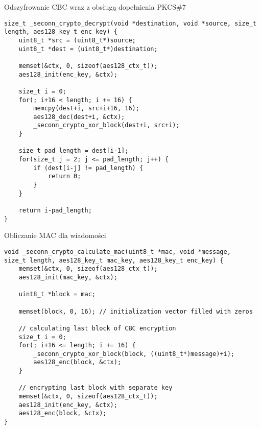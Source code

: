 \begin{table}
\caption{Odszyfrowanie CBC wraz z obsługą dopełnienia PKCS\#7}
\label{lst:decrypt}
\begin{lstlisting}
size_t _seconn_crypto_decrypt(void *destination, void *source, size_t length, aes128_key_t enc_key) {
    uint8_t *src = (uint8_t*)source;
    uint8_t *dest = (uint8_t*)destination;

    memset(&ctx, 0, sizeof(aes128_ctx_t));
    aes128_init(enc_key, &ctx);

    size_t i = 0;
    for(; i+16 < length; i += 16) {
        memcpy(dest+i, src+i+16, 16);
        aes128_dec(dest+i, &ctx);
        _seconn_crypto_xor_block(dest+i, src+i);
    }

    size_t pad_length = dest[i-1];
    for(size_t j = 2; j <= pad_length; j++) {
        if (dest[i-j] != pad_length) {
            return 0;
        }
    }

    return i-pad_length;
}
\end{lstlisting}
\end{table}

\begin{table}
\caption{Obliczanie MAC dla wiadomości}
\label{lst:mac}
\begin{lstlisting}
void _seconn_crypto_calculate_mac(uint8_t *mac, void *message,
size_t length, aes128_key_t mac_key, aes128_key_t enc_key) {
    memset(&ctx, 0, sizeof(aes128_ctx_t));
    aes128_init(mac_key, &ctx);

    uint8_t *block = mac;

    memset(block, 0, 16); // initialization vector filled with zeros

    // calculating last block of CBC encryption
    size_t i = 0;
    for(; i+16 <= length; i += 16) {
        _seconn_crypto_xor_block(block, ((uint8_t*)message)+i);
        aes128_enc(block, &ctx);
    }

    // encrypting last block with separate key
    memset(&ctx, 0, sizeof(aes128_ctx_t));
    aes128_init(enc_key, &ctx);
    aes128_enc(block, &ctx);
}
\end{lstlisting}
\end{table}
